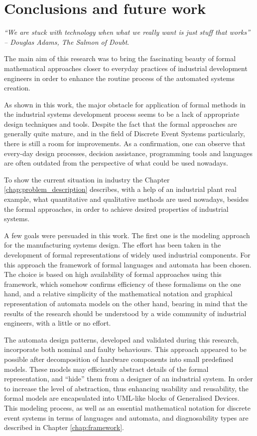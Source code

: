 
\chapter{Conclusions and future work}
\label{chap:conclusions}


\emph{``We are stuck with technology when what we really want is just stuff that
works'' -- Douglas Adams, The Salmon of Doubt}.

The main aim of this research was to bring the fascinating beauty of formal
mathematical approaches closer to everyday practices of industrial
development engineers in order to enhance the routine process of 
the automated systems creation.

As shown in this work, the major obstacle for application of formal methods in
the industrial systems development process seems to be a lack of appropriate
design techniques and tools. Despite the fact that the formal approaches are
generally quite mature, and in the field of Discrete Event Systems particularly,
there is still a room for improvements.
As a confirmation, one can observe that every-day design processes, decision
assistance, programming tools and languages are often outdated from the
perspective of what could be used nowadays.

To show the current situation in industry the Chapter
\ref{chap:problem_description} describes, with a help of an industrial plant
real example, what quantitative and qualitative methods are used nowadays,
besides the formal approaches, in order to achieve desired properties of
industrial systems.

A few goals were persuaded in this work. The first one is the modeling
approach for the manufacturing systems design. The effort has been taken in
the development of formal representations of widely used industrial components.
For this approach the framework of formal languages and automata has
been chosen. The choice is based on high availability of formal approaches
using this framework, which somehow confirms efficiency of these formalisms on
the one hand, and a relative simplicity of the mathematical notation and graphical
representation of automata models on the other hand, bearing in mind that the
results of the research should be understood by a wide community of industrial
engineers, with a little or no effort.

The automata design patterns, developed and validated during this research,
incorporate both nominal and faulty behaviours. This approach appeared to be
possible after decomposition of hardware components into small predefined
models. These models may efficiently abstract details of the
formal representation, and ``hide'' them from a designer of an
industrial system.
In order to increase the level of abstraction, thus enhancing usability and
reusability, the formal models are encapsulated into UML-like blocks of
Generalised Devices. This modeling process, as well as an essential mathematical
notation for discrete event systems in terms of languages and automata, and
diagnosability types are described in Chapter \ref{chap:framework}.

